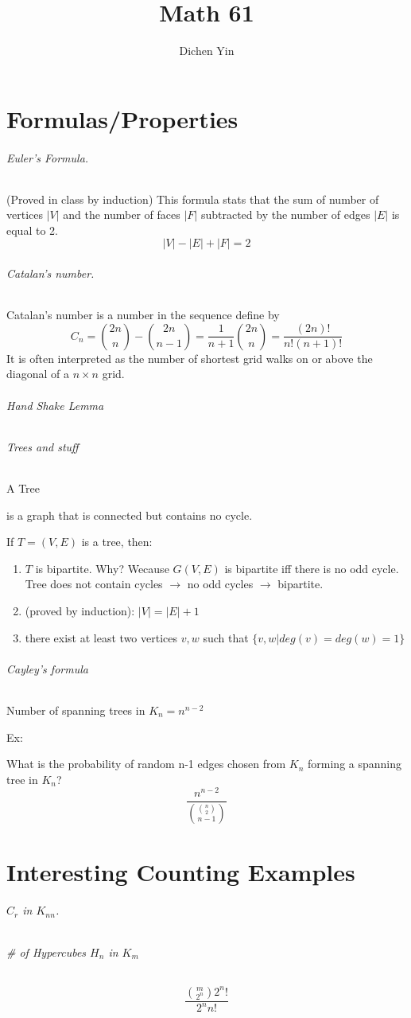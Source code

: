 \documentclass[10pt]{article}
\begin{document}
\author{Dichen Yin}
\title{\Huge{Math 61}}
\maketitle
\newpage
\part*{\Large{Formulas/Properties}}
\paragraph{Euler's Formula.} (Proved in class by induction) This formula stats that the sum of number of vertices $|V|$ and the number of faces $|F|$ subtracted by the number  of edges $|E|$ is equal to 2.  $$|V|-|E|+|F| = 2$$

\paragraph{Catalan's number.} Catalan's number is a number in the sequence define by 
\[
C_n = \binom{2n}{n} - \binom{2n}{n-1} = \frac{1}{n+1}\binom{2n}{n} =  \frac{(2n)!}{n! (n+1)!}
\]
It is often interpreted as the number of shortest grid walks on or above the diagonal of a $n \times n$ grid.
\paragraph{Hand Shake Lemma}
\paragraph{Trees and stuff} 
\subparagraph{A Tree} is a graph that is connected but contains no cycle.


If $T = (V,E)$ is a tree, then:
\begin{enumerate} 
\item $T$ is bipartite. Why? Wecause $G(V,E)$ is bipartite iff there is no odd cycle.\\
Tree does not contain cycles  $\rightarrow$ no odd cycles $\rightarrow$ bipartite.
\item (proved by induction):  $|V| = |E| + 1$
\item there exist at least two vertices $v, w$ such that $\{v, w | deg(v) = deg(w) = 1\}$
\end{enumerate}


\paragraph{Cayley's formula} Number of spanning trees in $K_n = n^{n-2}$
\subparagraph{Ex:} What is the probability of random n-1 edges chosen from $K_n$ forming a spanning tree in $K_n$? 
\[
\frac{n^{n-2}}{\binom{\binom{n}{2}}{n-1}}
\]  

\part*{\Large{Interesting Counting Examples}}
\paragraph{$C_r$ in $K_{nn}$.}  
\paragraph{\# of Hypercubes $H_n$ in $K_m$} 

\[
\frac{\binom{m}{2^n}2^n!}{2^nn!}
\]
\end{document}
